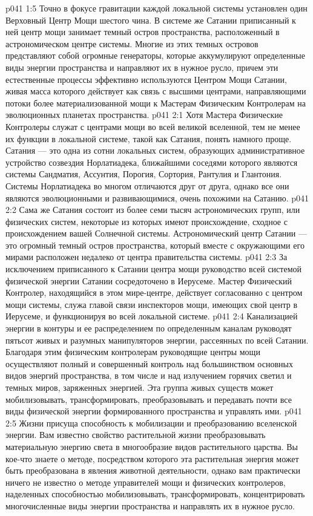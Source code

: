 \vs p041 1:5 Точно в фокусе гравитации каждой локальной системы установлен один Верховный Центр Мощи шестого чина. В системе же Сатании приписанный к ней центр мощи занимает темный остров пространства, расположенный в астрономическом центре системы. Многие из этих темных островов представляют собой огромные генераторы, которые аккумулируют определенные виды энергии пространства и направляют их в нужное русло, причем эти естественные процессы эффективно используются Центром Мощи Сатании, живая масса которого действует как связь с высшими центрами, направляющими потоки более материализованной мощи к Мастерам Физическим Контролерам на эволюционных планетах пространства.
\vs p041 2:1 Хотя Мастера Физические Контролеры служат с центрами мощи во всей великой вселенной, тем не менее их функции в локальной системе, такой как Сатания, понять намного проще. Сатания --- это одна из сотни локальных систем, образующих административное устройство созвездия Норлатиадека, ближайшими соседями которого являются системы Сандматия, Ассунтия, Порогия, Сортория, Рантулия и Глантония. Системы Норлатиадека во многом отличаются друг от друга, однако все они являются эволюционными и развивающимися, очень похожими на Сатанию.
\vs p041 2:2 Сама же Сатания состоит из более семи тысяч астрономических групп, или физических систем, некоторые из которых имеют происхождение, сходное с происхождением вашей Солнечной системы. Астрономический центр Сатании --- это огромный темный остров пространства, который вместе с окружающими его мирами расположен недалеко от центра правительства системы.
\vs p041 2:3 \pc За исключением приписанного к Сатании центра мощи руководство всей системой физической энергии Сатании сосредоточено в Иерусеме. Мастер Физический Контролер, находящийся в этом мире\hyp{}центре, действует согласованно с центром мощи системы, служа главой связи инспекторов мощи, имеющих свой центр в Иерусеме, и функционируя во всей локальной системе.
\vs p041 2:4 Канализацией энергии в контуры и ее распределением по определенным каналам руководят пятьсот живых и разумных манипуляторов энергии, рассеянных по всей Сатании. Благодаря этим физическим контролерам руководящие центры мощи осуществляют полный и совершенный контроль над большинством основных видов энергий пространства, в том числе и над излучением горячих светил и темных миров, заряженных энергией. Эта группа живых существ может мобилизовывать, трансформировать, преобразовывать и передавать почти все виды физической энергии формированного пространства и управлять ими.
\vs p041 2:5 Жизни присуща способность к мобилизации и преобразованию вселенской энергии. Вам известно свойство растительной жизни преобразовывать материальную энергию света в многообразие видов растительного царства. Вы кое\hyp{}что знаете о методе, посредством которого эта растительная энергия может быть преобразована в явления животной деятельности, однако вам практически ничего не известно о методе управителей мощи и физических контролеров, наделенных способностью мобилизовывать, трансформировать, концентрировать многочисленные виды энергии пространства и направлять их в нужное русло.
